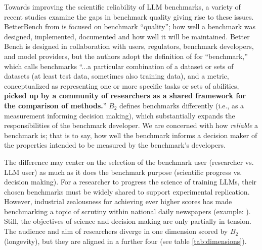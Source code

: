 \documentclass{article}
\newcommand\bb{$B_2$ }
\begin{document}
Towards improving the scientific reliability of LLM benchmarks, a variety of recent studies examine the gaps in benchmark quality giving rise to these issues. BetterBench from \cite{reuel2024betterbench} is focused on benchmark ``quality''; how well a benchmark was designed, implemented, documented and how well it will be maintained. Better Bench is designed in collaboration with users, regulators, benchmark developers, and model providers, but the authors adopt the definition of \cite{raji2021ai} for ``benchmark,'' which calls benchmarks ``...a particular combination of a dataset or sets of datasets (at least test data, sometimes also training data), and a metric, conceptualized as representing one or more specific tasks or sets of abilities, \textbf{picked up by a community of researchers as a shared framework for the comparison of methods.}'' \bb defines benchmarks differently (i.e., as a measurement informing decision making), which substantially expands the responsibilities of the benchmark developer. We are concerned with how \textit{reliable} a benchmark is; that is to say, how well the benchmark informs a decision maker of the properties intended to be measured by the benchmark's developers.

The difference may center on the selection of the benchmark user (researcher vs. LLM user) as much as it does the benchmark purpose (scientific progress vs. decision making). For a researcher to progress the science of training LLMs, their chosen benchmarks must be widely shared to support experimental replication. However, industrial zealousness for achieving ever higher scores has made benchmarking a topic of scrutiny within national daily newspapers (example: \cite{nytimesAIMeasurement}). Still, the objectives of science and decision making are only partially in tension. The audience and aim of researchers diverge in one dimension scored by \bb (longevity), but they are aligned in a further four (see table \ref{tab:dimensions}).
\end{document}
